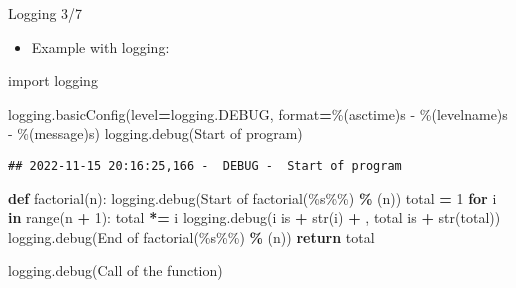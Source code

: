 \documentclass[
  8pt,
  ignorenonframetext,
]{beamer}
\newenvironment{Shaded}{\begin{snugshade}}{\end{snugshade}}
\newcommand{\BuiltInTok}[1]{#1}
\newcommand{\ControlFlowTok}[1]{\textcolor[rgb]{0.13,0.29,0.53}{\textbf{#1}}}
\newcommand{\DecValTok}[1]{\textcolor[rgb]{0.00,0.00,0.81}{#1}}
\newcommand{\ImportTok}[1]{#1}
\newcommand{\KeywordTok}[1]{\textcolor[rgb]{0.13,0.29,0.53}{\textbf{#1}}}
\newcommand{\NormalTok}[1]{#1}
\newcommand{\OperatorTok}[1]{\textcolor[rgb]{0.81,0.36,0.00}{\textbf{#1}}}
\newcommand{\SpecialCharTok}[1]{\textcolor[rgb]{0.00,0.00,0.00}{#1}}
\newcommand{\StringTok}[1]{\textcolor[rgb]{0.31,0.60,0.02}{#1}}
\providecommand{\tightlist}{%
  \setlength{\itemsep}{0pt}\setlength{\parskip}{0pt}}
\begin{document}
\begin{frame}[fragile]{Logging 3/7}
\protect\hypertarget{logging-37}{}
\begin{itemize}
\tightlist
\item
  Example with logging:
\end{itemize}

\begin{Shaded}
\begin{Highlighting}[]
\ImportTok{import}\NormalTok{ logging}

\NormalTok{logging.basicConfig(level}\OperatorTok{=}\NormalTok{logging.DEBUG, }\BuiltInTok{format}\OperatorTok{=}\StringTok{\textquotesingle{}}\SpecialCharTok{\%(asctime)s}\StringTok{ {-}  }\SpecialCharTok{\%(levelname)s}\StringTok{ {-}  }\SpecialCharTok{\%(message)s}\StringTok{\textquotesingle{}}\NormalTok{)}
\NormalTok{logging.debug(}\StringTok{\textquotesingle{}Start of program\textquotesingle{}}\NormalTok{)}
\end{Highlighting}
\end{Shaded}

\begin{verbatim}
## 2022-11-15 20:16:25,166 -  DEBUG -  Start of program
\end{verbatim}

\begin{Shaded}
\begin{Highlighting}[]
\KeywordTok{def}\NormalTok{ factorial(n):}
\NormalTok{    logging.debug(}\StringTok{\textquotesingle{}Start of factorial(}\SpecialCharTok{\%s\%\%}\StringTok{)\textquotesingle{}}  \OperatorTok{\%}\NormalTok{ (n))}
\NormalTok{    total }\OperatorTok{=} \DecValTok{1}
    \ControlFlowTok{for}\NormalTok{ i }\KeywordTok{in} \BuiltInTok{range}\NormalTok{(n }\OperatorTok{+} \DecValTok{1}\NormalTok{):}
\NormalTok{        total }\OperatorTok{*=}\NormalTok{ i}
\NormalTok{        logging.debug(}\StringTok{\textquotesingle{}i is \textquotesingle{}} \OperatorTok{+} \BuiltInTok{str}\NormalTok{(i) }\OperatorTok{+} \StringTok{\textquotesingle{}, total is \textquotesingle{}} \OperatorTok{+} \BuiltInTok{str}\NormalTok{(total))}
\NormalTok{    logging.debug(}\StringTok{\textquotesingle{}End of factorial(}\SpecialCharTok{\%s\%\%}\StringTok{)\textquotesingle{}}  \OperatorTok{\%}\NormalTok{ (n))}
    \ControlFlowTok{return}\NormalTok{ total}

\NormalTok{logging.debug(}\StringTok{\textquotesingle{}Call of the function\textquotesingle{}}\NormalTok{)}
\end{Highlighting}
\end{Shaded}


\end{frame}
\end{document}
